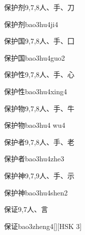 \begin{entry}{保护剂}{9,7,8}{⼈、⼿、⼑}
  \begin{phonetics}{保护剂}{bao3hu4ji4}
  \end{phonetics}
\end{entry}

\begin{entry}{保护国}{9,7,8}{⼈、⼿、⼞}
  \begin{phonetics}{保护国}{bao3hu4guo2}
  \end{phonetics}
\end{entry}

\begin{entry}{保护性}{9,7,8}{⼈、⼿、⼼}
  \begin{phonetics}{保护性}{bao3hu4xing4}
  \end{phonetics}
\end{entry}

\begin{entry}{保护物}{9,7,8}{⼈、⼿、⽜}
  \begin{phonetics}{保护物}{bao3hu4 wu4}
  \end{phonetics}
\end{entry}

\begin{entry}{保护者}{9,7,8}{⼈、⼿、⽼}
  \begin{phonetics}{保护者}{bao3hu4zhe3}
  \end{phonetics}
\end{entry}

\begin{entry}{保护神}{9,7,9}{⼈、⼿、⽰}
  \begin{phonetics}{保护神}{bao3hu4shen2}
  \end{phonetics}
\end{entry}

\begin{entry}{保证}{9,7}{⼈、⾔}
  \begin{phonetics}{保证}{bao3zheng4}[][HSK 3]
  \end{phonetics}
\end{entry}

